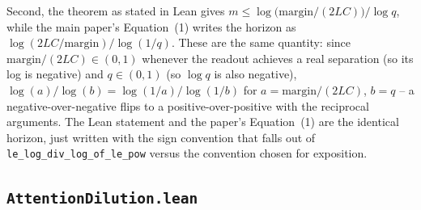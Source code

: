 \documentclass[11pt]{article}
\begin{document}
Second, the theorem as stated in Lean gives
$m \le \log\!\big(\text{margin}/(2LC)\big)/\log q$, while the main paper's
Equation~(1) writes the horizon as $\log(2LC/\text{margin})/\log(1/q)$. These
are the same quantity: since $\text{margin}/(2LC) \in (0,1)$ whenever the
readout achieves a real separation (so its log is negative) and $q\in(0,1)$
(so $\log q$ is also negative), $\log(a)/\log(b) = \log(1/a)/\log(1/b)$ for
$a=\text{margin}/(2LC)$, $b=q$ -- a negative-over-negative flips to a
positive-over-positive with the reciprocal arguments. The Lean statement and
the paper's Equation~(1) are the identical horizon, just written with the
sign convention that falls out of \texttt{le\_log\_div\_log\_of\_le\_pow}
versus the convention chosen for exposition.

\subsection{\texttt{AttentionDilution.lean}}
\label{sec:s1-dilution}
\end{document}
